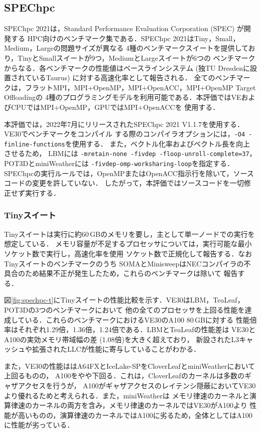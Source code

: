 ﻿\documentclass[submit,techrep,noauthor]{ipsj}
\begin{document}
\subsection{SPEChpc}\label{sec:spechpc}

SPEChpc 2021\cite{Li2022}は，Standard Performance Evaluation Corporation (SPEC) が開発する
HPC向けのベンチマーク集である．SPEChpc 2021はTiny，Small，Medium，Largeの問題サイズが異なる
4種のベンチマークスイートを提供しており，TinyとSmallスイートが9つ，MediumとLargeスイートが6つの
ベンチマークからなる．各ベンチマークの性能値はベースラインシステム (独TU Dresdenに設置されているTaurus) 
に対する高速化率として報告される．
全てのベンチマークは，フラットMPI，MPI+OpenMP，MPI+OpenACC，MPI+OpenMP Target Offloadingの
4種のプログラミングモデルを利用可能である．本評価ではVEおよびCPUではMPI+OpenMP，GPUではMPI+OpenACCを
使用する．

本評価では，2022年7月にリリースされたSPEChpc 2021 V1.1.7を使用する．VE30でベンチマークをコンパイル
する際のコンパイラオプションには，\texttt{-O4 -finline-functions}を使用する．
また，ベクトル化率およびベクトル長を向上させるため，
LBMには \texttt{-mretain-none -fivdep -floop-unroll-complete=37}，
POT3DとminiWeatherには \texttt{-fivdep-omp-worksharing-loop}を指定する．
SPEChpcの実行ルールでは，OpenMPまたはOpenACC指示行を除いて，ソースコードの変更を許していない．
したがって，本評価ではソースコードを一切修正せず実行する．

\subsubsection{Tinyスイート}

Tinyスイートは実行に約60\,GBのメモリを要し，主として単一ノードでの実行を想定している．
メモリ容量が不足するプロセッサについては，実行可能な最小ソケット数で実行し，高速化率を使用
ソケット数で正規化して報告する．なおTinyスイートのベンチマークのうち
SOMAとMinisweepはNECコンパイラの不具合のため結果不正が発生したため，これらのベンチマークは除いて
報告する．

図\ref{fig:spechpc-t}にTinyスイートの性能比較を示す．VE30はLBM，TeaLeaf，POT3Dの3つのベンチマークにおいて
他の全てのプロセッサを上回る性能を達成している．これらのベンチマークにおけるVE30のA100 80\,GBに対する
性能倍率はそれぞれ1.29倍，1.36倍，1.24倍である．LBMとTeaLeafの性能差は
VE30とA100の実効メモリ帯域幅の差 (1.08倍)を大きく超えており，
新設されたL3キャッシュや拡張されたLLCが性能に寄与していることがわかる．

また，VE30の性能ははA64FXとIceLake-SPをCloverLeafとminiWeatherにおいて上回るものの，
A100をやや下回る．これは，CloverLeafのカーネルは多数のギャザアクセスを行うが，
A100がギャザアクセスのレイテンシ隠蔽においてVE30より優れるためと考えられる．また，miniWeatherは
メモリ律速のカーネルと演算律速のカーネルの両方を含み，メモリ律速のカーネルではVE30がA100より
性能が高いものの，演算律速のカーネルではA100に劣るため，全体としてはA100に性能が劣っている．
\end{document}
